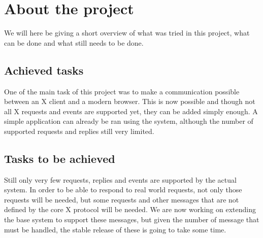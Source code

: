 \section{About the project}
We will here be giving a short overview of what was tried in this project, 
what can be done and what still needs to be done.
\subsection{Achieved tasks}
One of the main task of this project was to make a communication possible 
between an X client and a modern browser. This is now possible and though 
not all X requests and events are supported yet, they can be added 
simply enough.
A simple application can already be ran using the system, although the 
number of supported requests and replies still very limited.
\subsection{Tasks to be achieved}
Still only very few requests, replies and events are supported by the 
actual system. In order to be able to respond to real world requests, 
not only those requests will be needed, but some requests and 
other messages that are not defined by the core 
X protocol will be needed. 
We are now working on extending the base system to support 
these messages, but given the number of message that must be handled, 
the stable release of these is going to take some time.